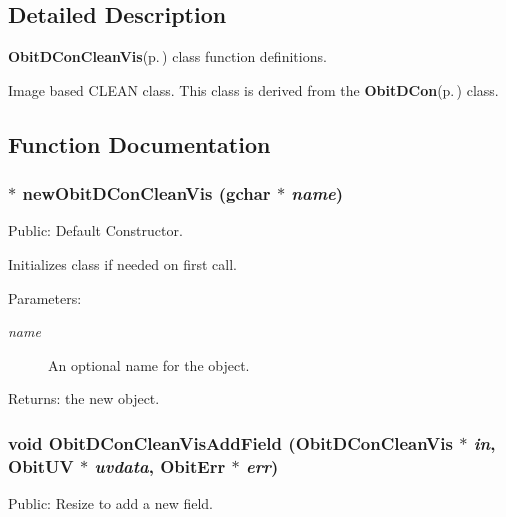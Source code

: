 \subsection{Detailed Description}
{\bf Obit\-DCon\-Clean\-Vis}{\rm (p.\,\pageref{structObitDConCleanVis})} class function definitions. 

Image based CLEAN class. This class is derived from the {\bf Obit\-DCon}{\rm (p.\,\pageref{structObitDCon})} class.

\subsection{Function Documentation}
\subsubsection{$\ast$ new\-Obit\-DCon\-Clean\-Vis (gchar $\ast$ {\em name})}\label{ObitDConCleanVis_8c_a12}


Public: Default Constructor. 

Initializes class if needed on first call. \begin{Desc}
\item[Parameters:]
\begin{description}
\item[{\em name}]An optional name for the object. \end{description}
\end{Desc}
\begin{Desc}
\item[Returns:]the new object. \end{Desc}
\subsubsection{\setlength{\rightskip}{0pt plus 5cm}void Obit\-DCon\-Clean\-Vis\-Add\-Field ({\bf Obit\-DCon\-Clean\-Vis} $\ast$ {\em in}, {\bf Obit\-UV} $\ast$ {\em uvdata}, {\bf Obit\-Err} $\ast$ {\em err})}\label{ObitDConCleanVis_8c_a25}


Public: Resize to add a new field. 

